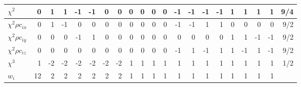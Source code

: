 \begin{table}
\begin{tabular}{|l||r|rrrrrr|rrrr|rrrr|rrrr|r||}
\hline
$\chi^2$ & 0 &  1 &  1 &  -1&  -1 &  0 &  0 & 
         0 &  0 &  0 &  0 &  -1 &  -1 & -1 & -1 & 1 & 1 & 1 & 1
& 9/4\\
\hline
$\chi^2 \rho c_{ix}$ & 0 &  1 &  -1 &  0&  0 &  0 &  0 & 
         0 &  0 &  0 &  0 &  -1 &  -1 & 1 & 1 & 0 & 0 & 0 & 0
& 9/2\\
\hline
$\chi^2 \rho c_{iy}$ & 0 &  0 &  0 & -1&   1 &  0 &  0 & 
         0 &  0 &  0 &  0 &   0 &  0 & 0 & 0 & 1 &  1 & -1 & -1
& 9/2\\
\hline
$\chi^2 \rho c_{iz}$ & 0 &  0 &  0 &  0&  0 &  0 &  0 & 
         0 &  0 &  0 &  0 &  -1 &  1 & -1 & 1 & 1 & -1 & 1 & -1
& 9/2\\
\hline
$\chi^3$ & 1 &  -2 &  -2 &  -2&  -2 &  -2 &  -2 & 
         1 &  1 &  1 &  1 &  1 &  1 & 1 & 1 & 1 & 1 & 1 & 1
& 1/2\\
\hline\hline
$w_i$ & 12 & 2 & 2 & 2 & 2 & 2 & 2 & 
1 & 1 & 1 & 1 & 1 & 1 & 1 & 1 & 1 & 1 & 1 & 1
& \\
\hline\hline
\end{tabular}
\end{table}



\pagebreak


